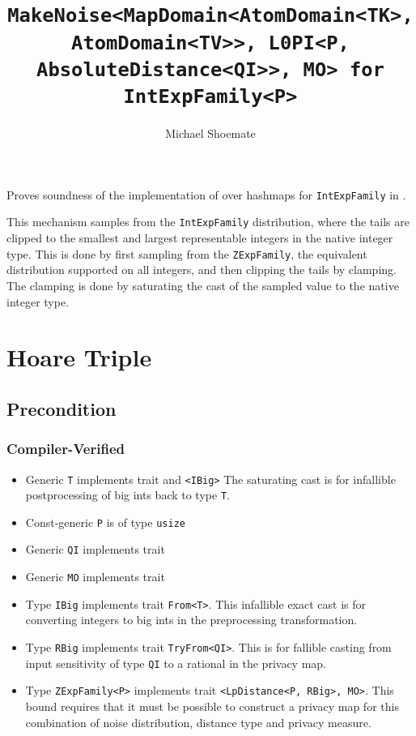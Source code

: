 \documentclass{article}
\title{\texttt{MakeNoise<MapDomain<AtomDomain<TK>, AtomDomain<TV>>, L0PI<P, AbsoluteDistance<QI>>, MO> for IntExpFamily<P>}}
\author{Michael Shoemate}
\date{}
\begin{document}
\maketitle

\contrib
Proves soundness of the implementation of  over hashmaps
for \texttt{IntExpFamily} in .

This mechanism samples from the \texttt{IntExpFamily} distribution, 
where the tails are clipped to the smallest and largest representable integers in the native integer type.
This is done by first sampling from the \texttt{ZExpFamily}, the equivalent distribution supported on all integers,
and then clipping the tails by clamping.
The clamping is done by saturating the cast of the sampled value to the native integer type.

\section{Hoare Triple}
\subsection*{Precondition}
\subsubsection*{Compiler-Verified}

\begin{itemize}
    \item Generic \texttt{T} implements trait  and \texttt{<IBig>}
        The saturating cast is for infallible postprocessing of big ints back to type \texttt{T}.
    \item Const-generic \texttt{P} is of type \texttt{usize}
    \item Generic \texttt{QI} implements trait 
    \item Generic \texttt{MO} implements trait 
    \item Type \texttt{IBig} implements trait \texttt{From<T>}.
        This infallible exact cast is for converting integers to big ints in the preprocessing transformation.
    \item Type \texttt{RBig} implements trait \texttt{TryFrom<QI>}.
        This is for fallible casting from input sensitivity of type \texttt{QI} to a rational in the privacy map.
    \item Type \texttt{ZExpFamily<P>} implements trait \texttt{<LpDistance<P, RBig>, MO>}.
        This bound requires that it must be possible to construct a privacy map for this combination of noise distribution, distance type and privacy measure.
\end{itemize}
\end{document}
